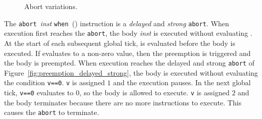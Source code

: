\begin{figure}
	\centering
	

	
	\caption{Abort variations.}
	\label{fig:forec_preemption}
\end{figure}

The \verb$abort$~\emph{inst} \verb$when$~(\expression{})
instruction is a \emph{delayed} and \emph{strong} \verb$abort$.
When execution first reaches the \verb$abort$, the body 
\emph{inst} is executed without evaluating \expression{}. At the start
of each subsequent global tick, \expression{} is evaluated 
before the body is executed. If \expression{} evaluates to a non-zero 
value, then the preemption is triggered and the body is preempted.
When execution reaches the delayed and strong \verb$abort$
of Figure~\ref{fig:preemption_delayed_strong},
the body is executed without evaluating the condition \verb$v==0$. 
\verb$v$ is assigned $1$ and the execution pauses. In 
the next global tick, \verb$v==0$ evaluates to $0$, 
so the body is allowed to execute. \verb$v$ is assigned $2$
and the body terminates because there are no more instructions to
execute. This causes the \verb$abort$ to terminate.

